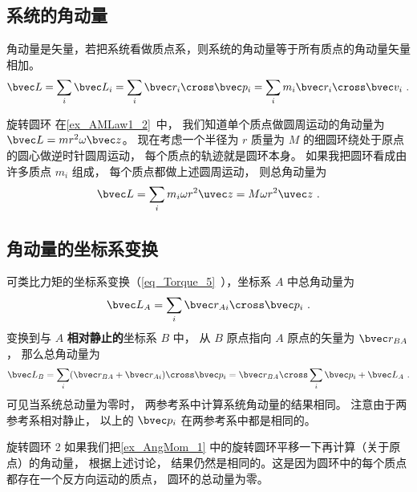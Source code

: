 

\subsection{系统的角动量}
角动量是矢量，若把系统看做质点系，则系统的角动量等于所有质点的角动量矢量相加。
\begin{equation}\label{eq_AngMom_1}
\bvec L = \sum_i \bvec L_i = \sum_i \bvec r_i \cross\bvec p_i = \sum_i m_i \bvec r_i \cross\bvec v_i~.
\end{equation}
\begin{example}{旋转圆环}\label{ex_AngMom_1}
在\autoref{ex_AMLaw1_2}~中， 我们知道单个质点做圆周运动的角动量为 $\bvec L = m r^2 \omega \bvec z$。 现在考虑一个半径为 $r$ 质量为 $M$ 的细圆环绕处于原点的圆心做逆时针圆周运动， 每个质点的轨迹就是圆环本身。 如果我把圆环看成由许多质点 $m_i$ 组成， 每个质点都做上述圆周运动， 则总角动量为
\begin{equation}
\bvec L = \sum_i m_i \omega r^2 \uvec z = M \omega r^2 \uvec z~.
\end{equation}
\end{example}

\subsection{角动量的坐标系变换}
可类比力矩的坐标系变换（\autoref{eq_Torque_5}~），坐标系 $A$ 中总角动量为
\begin{equation}
\bvec L_A = \sum_i \bvec r_{Ai} \cross \bvec p_i ~.
\end{equation}
变换到与 $A$ \textbf{相对静止的}坐标系 $B$ 中， 从 $B$ 原点指向 $A$ 原点的矢量为 $\bvec r_{BA}$， 那么总角动量为
\begin{equation}\label{eq_AngMom_4}
\bvec L_B = \sum_i (\bvec r_{BA} + \bvec r_{Ai})\cross \bvec p_i = \bvec r_{BA}\cross \sum_i \bvec p_i + \bvec L_A~.
\end{equation}
可见当系统总动量为零时， 两参考系中计算系统角动量的结果相同。 注意由于两参考系相对静止， 以上的 $\bvec p_i$ 在两参考系中都是相同的。

\begin{example}{旋转圆环 2}\label{ex_AngMom_2}
如果我们把\autoref{ex_AngMom_1} 中的旋转圆环平移一下再计算（关于原点）的角动量， 根据上述讨论， 结果仍然是相同的。这是因为圆环中的每个质点都存在一个反方向运动的质点， 圆环的总动量为零。
\end{example}

